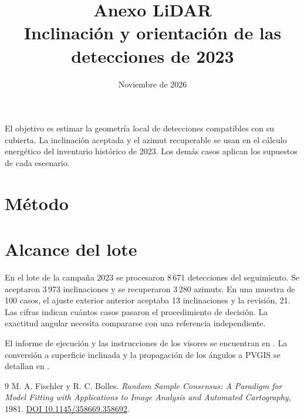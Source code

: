 \documentclass[11pt,a4paper]{article}
\title{Anexo LiDAR\\Inclinación y orientación de las detecciones de 2023}
\author{}
\date{Noviembre de 2026}
\begin{document}
\maketitle

El objetivo es estimar la geometría local de detecciones compatibles con su cubierta. La inclinación aceptada y el azimut recuperable se usan en el cálculo energético del inventario histórico de 2023. Los demás casos aplican los supuestos de cada escenario.

\section{Método}


\section{Alcance del lote}

En el lote de la campaña 2023 se procesaron 8\,671 detecciones del seguimiento. Se aceptaron 3\,973 inclinaciones y se recuperaron 3\,280 azimuts. En una muestra de 100 casos, el ajuste exterior anterior aceptaba 13 inclinaciones y la revisión, 21. Las cifras indican cuántos casos pasaron el procedimiento de decisión. La exactitud angular necesita compararse con una referencia independiente.

El informe de ejecución y las instrucciones de los visores se encuentran en . La conversión a superficie inclinada y la propagación de los ángulos a PVGIS se detallan en .

\begin{thebibliography}{9}
 M. A. Fischler y R. C. Bolles. \emph{Random Sample Consensus: A Paradigm for Model Fitting with Applications to Image Analysis and Automated Cartography}, 1981. \href{https://doi.org/10.1145/358669.358692}{DOI 10.1145/358669.358692}.
\end{thebibliography}
\end{document}
